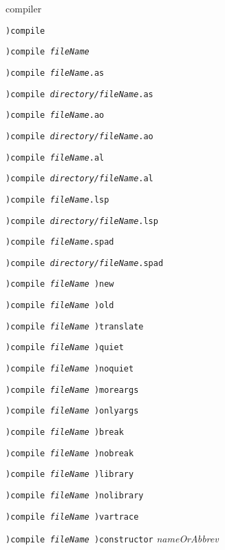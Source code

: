 

\par{} compiler

\par{}

\begin{simpleList}
\item {\tt )compile}
\item {\tt )compile {\it fileName}}
\item {\tt )compile {\it fileName}.as}
\item {\tt )compile {\it directory/fileName}.as}
\item {\tt )compile {\it fileName}.ao}
\item {\tt )compile {\it directory/fileName}.ao}
\item {\tt )compile {\it fileName}.al}
\item {\tt )compile {\it directory/fileName}.al}
\item {\tt )compile {\it fileName}.lsp}
\item {\tt )compile {\it directory/fileName}.lsp}
\item {\tt )compile {\it fileName}.spad}
\item {\tt )compile {\it directory/fileName}.spad}
\item {\tt )compile {\it fileName} )new}
\item {\tt )compile {\it fileName} )old}
\item {\tt )compile {\it fileName} )translate}
\item {\tt )compile {\it fileName} )quiet}
\item {\tt )compile {\it fileName} )noquiet}
\item {\tt )compile {\it fileName} )moreargs}
\item {\tt )compile {\it fileName} )onlyargs}
\item {\tt )compile {\it fileName} )break}
\item {\tt )compile {\it fileName} )nobreak}
\item {\tt )compile {\it fileName} )library}
\item {\tt )compile {\it fileName} )nolibrary}
\item {\tt )compile {\it fileName} )vartrace}
\item {\tt )compile {\it fileName} )constructor} {\it nameOrAbbrev}
\end{simpleList}

